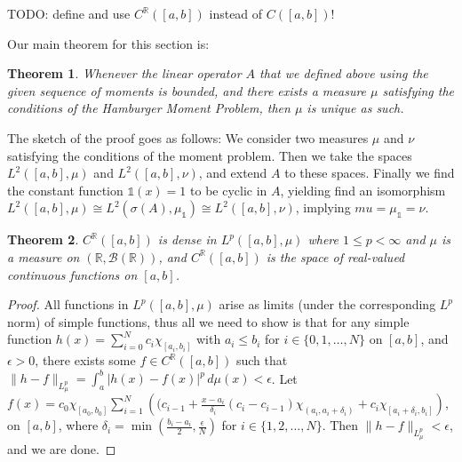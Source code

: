 \documentclass[12pt,oneside]{report}
\newtheorem{thm}{Theorem}[chapter]
\begin{document}
TODO: define and use $C^{\mathbb{R}}([a,b])$ instead of $C([a,b])$!
 
Our main theorem for this section is:

\begin{thm}
    Whenever the linear operator $A$ that we defined above using the given sequence of moments is bounded, and there exists a measure $\mu$ satisfying the conditions of the Hamburger Moment Problem, then $\mu$ is unique as such.
\end{thm}

The sketch of the proof goes as follows: We consider two measures $\mu$ and $\nu$ satisfying the conditions of the moment problem. Then we take the spaces $L^{2}([a,b], \mu)$ and $L^{2}([a,b], \nu)$, and extend $A$ to these spaces. Finally we find the constant function $\mathds{1}(x) = 1$ to be cyclic in $A$, yielding find an isomorphism $L^{2}([a,b], \mu) \cong L^2(\sigma(A), \mu_\mathds{1}) \cong L^{2}([a,b], \nu)$, implying $mu = \mu_\mathds{1} = \nu$.


\begin{thm}
    $C^{\mathbb{R}}([a,b])$ is dense in $L^{p}([a,b], \mu)$ where $1 \leq p <\infty$ and $\mu$ is a measure on $(\mathbb{R},\mathcal{B}(\mathbb{R}))$, and $C^{\mathbb{R}}([a,b])$ is the space of real-valued continuous functions on $[a,b]$.
\end{thm}
\begin{proof}
    All functions in $L^{p}([a,b],\mu)$ arise as limits (under the corresponding $L^{p}$ norm) of simple functions, thus all we need to show is that for any simple function $h(x) = \sum_{i=0}^{N}c_{i}\chi_{[a_{i},b_{i}]}$ with $a_{i} \leq b_{i}$ for $i \in \{ 0,1,\dots,N \}$ on $[a,b]$, and $\epsilon > 0$, there exists some $f \in C^{\mathbb{R}}([a,b])$ such that $\|h - f\|_{L^{p}_{\mu}} = \int _{a}^{b} |h(x) - f(x)|^{p} \, d\mu(x) < \epsilon$. Let $f(x) = c_{0}\chi_{[a_{0},b_{0}]} \sum_{i=1}^{N} \left( (c_{i-1} + \frac{x - a_{i}}{\delta_{i}}(c_{i} - c_{i-1})\chi_{(a_{i},a_{i}+\delta_{i})} + c_{i}\chi_{\left[ a_{i} + \delta_{i}, b_{i} \right]} \right)$, on $[a,b]$, where $\delta_{i} = \min\left( \frac{b_{i} - a_{i}}{2}, \frac{\epsilon}{N} \right)$ for $i \in \{ 1,2,\dots,N \}$. Then $\|h - f\|_{L^{p}_{\mu}} < \epsilon$, and we are done.
\end{proof}
\end{document}
